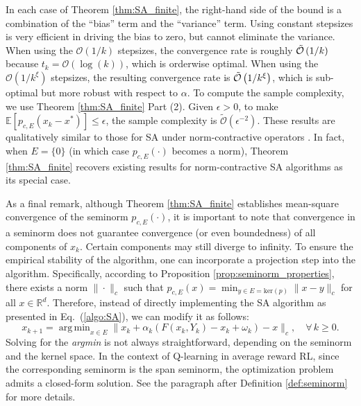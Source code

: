 \documentclass[11 pt]{article}
\DeclareMathOperator*{\argmin}{arg\,min}
\begin{document}
	
	
	In each case of Theorem \ref{thm:SA_finite}, the right-hand side of the bound is a combination of the ``bias'' term and the ``variance'' term. Using constant stepsizes is very efficient in driving the bias to zero, but cannot eliminate the variance. When using the $\mathcal{O}(1/k)$ stepsizes, the convergence rate is roughly $\Tilde{\mathcal{O}}\left(1/k\right)$ because $t_k=\mathcal{O}(\log(k))$, which is orderwise optimal. When using the $\mathcal{O}(1/k^\xi)$ stepsizes, the resulting convergence rate is $\Tilde{\mathcal{O}}\left(1/k^{\xi}\right)$, which is sub-optimal but more robust with respect to $\alpha$. To compute the sample complexity, we use Theorem \ref{thm:SA_finite} Part (2). Given $\epsilon>0$, to make
	$\mathbb{E}[p_{c,E}(x_{k}-x^*)]\leq \epsilon$, the sample complexity is $\tilde{\mathcal{O}}(\epsilon^{-2})$. These results are qualitatively similar to those for SA under norm-contractive operators \cite{chen2021lyapunov}. In fact, when $E=\{0\}$ (in which case $p_{c,E}(\cdot)$ becomes a norm), Theorem \ref{thm:SA_finite} recovers existing results for norm-contractive SA algorithms as its special case. 
	
	As a final remark, although Theorem \ref{thm:SA_finite} establishes mean-square convergence of the seminorm $p_{c,E}(\cdot)$, it is important to note that convergence in a seminorm does not guarantee convergence (or even boundedness) of all components of $x_k$. Certain components may still diverge to infinity. To ensure the empirical stability of the algorithm, one can incorporate a projection step into the algorithm. Specifically, according to Proposition \ref{prop:seminorm_properties}, there exists a norm $\|\cdot\|_c$ such that $p_{c,E}(x) = \min_{y \in E = \text{ker}(p)} \|x - y\|_c$ for all $x \in \mathbb{R}^d$.
	Therefore, instead of directly implementing the SA algorithm as presented in Eq.~(\ref{algo:SA}), we can modify it as follows:
	\[
	x_{k+1} = \argmin_{x \in E} \|x_k + \alpha_k \left(F(x_k, Y_k) - x_k + \omega_k\right) - x\|_c, \quad \forall\, k \geq 0.
	\]
	Solving for the \textit{argmin} is not always straightforward, depending on the seminorm and the kernel space. In the context of Q-learning in average reward RL, since the corresponding seminorm is the span seminorm, the optimization problem admits a closed-form solution. See the paragraph after Definition \ref{def:seminorm} for more details.
	
\end{document}
